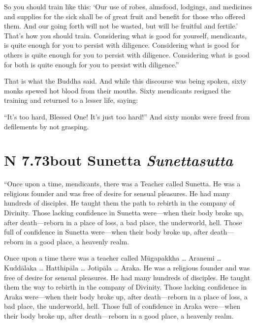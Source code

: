 \documentclass[12pt,openany]{book}%
\newcommand*{\suttatitleacronym}[1]{\smaller[2]{#1}\vspace*{.3em}}
\newcommand*{\suttatitletranslation}[1]{\linebreak{#1}}
\newcommand*{\suttatitleroot}[1]{\linebreak\smaller[2]\itshape{#1}}
\newcommand*{\tocacronym}[1]{\hspace*{-3.3em}{#1}\quad}
\newcommand*{\toctranslation}[1]{#1}
\newcommand*{\tocroot}[1]{(\textit{#1})}
\begin{document}
So you should train like this: ‘Our use of robes, almsfood, lodgings, and medicines and supplies for the sick shall be of great fruit and benefit for those who offered them. And our going forth will not be wasted, but will be fruitful and fertile.’ That’s how you should train. Considering what is good for yourself, mendicants, is quite enough for you to persist with diligence. Considering what is good for others is quite enough for you to persist with diligence. Considering what is good for both is quite enough for you to persist with diligence.” 

That is what the Buddha said. And while this discourse was being spoken, sixty monks spewed hot blood from their mouths. Sixty mendicants resigned the training and returned to a lesser life, saying: 

“It’s too hard, Blessed One! It’s just too hard!” And sixty monks were freed from defilements by not grasping. 

%
\section*{{\suttatitleacronym AN 7.73}{\suttatitletranslation About Sunetta }{\suttatitleroot Sunettasutta}}
\addcontentsline{toc}{section}{\tocacronym{AN 7.73} \toctranslation{About Sunetta } \tocroot{Sunettasutta}}

“Once upon a time, mendicants, there was a Teacher called Sunetta. He was a religious founder and was free of desire for sensual pleasures. He had many hundreds of disciples. He taught them the path to rebirth in the company of Divinity. Those lacking confidence in Sunetta were—when their body broke up, after death—reborn in a place of loss, a bad place, the underworld, hell. Those full of confidence in Sunetta were—when their body broke up, after death—reborn in a good place, a heavenly realm. 

Once upon a time there was a teacher called \textsanskrit{Mūgapakkha} … Aranemi … \textsanskrit{Kuddālaka} … \textsanskrit{Hatthipāla} … \textsanskrit{Jotipāla} … Araka. He was a religious founder and was free of desire for sensual pleasures. He had many hundreds of disciples. He taught them the way to rebirth in the company of Divinity. Those lacking confidence in Araka were—when their body broke up, after death—reborn in a place of loss, a bad place, the underworld, hell. Those full of confidence in Araka were—when their body broke up, after death—reborn in a good place, a heavenly realm. 
\end{document}
